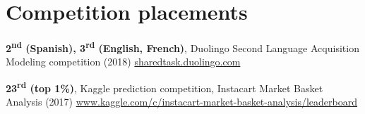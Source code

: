 \documentclass[10pt]{resume}
\begin{document}
\section{Competition placements}

\hrulefill

\begin{addmargin}[1em]{0em}

  \textbf{2\textsuperscript{nd} (Spanish), 3\textsuperscript{rd}
    (English, French)}, Duolingo Second Language Acquisition Modeling
  competition (2018) \newline
  \-\hspace{1em}\href{http://sharedtask.duolingo.com}{sharedtask.duolingo.com}

  \textbf{23\textsuperscript{rd} (top 1\%)}, Kaggle prediction
    competition, Instacart Market Basket Analysis (2017) \newline
    \-\hspace{1em} \href{https://www.kaggle.com/c/instacart-market-basket-analysis/leaderboard}{www.kaggle.com/c/instacart-market-basket-analysis/leaderboard}




\end{addmargin}





\end{document}
